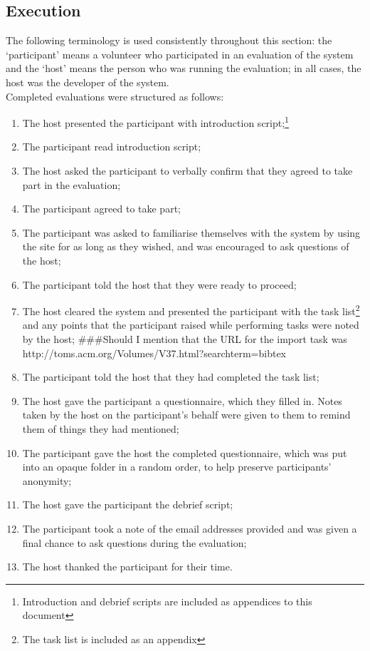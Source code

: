 \documentclass{l4proj}
\newcommand{\revisit}{\#\#\#}
\begin{document}
\subsection{Execution}
The following terminology is used consistently throughout this section: the `participant' means a volunteer who participated in an evaluation of the system and the `host' means the person who was running the evaluation; in all cases, the host was the developer of the system.\\
Completed evaluations were structured as follows:
\begin{enumerate}
	\item The host presented the participant with introduction script;\footnote{Introduction and debrief scripts are included as appendices to this document}
	\item The participant read introduction script;
	\item The host asked the participant to verbally confirm that they agreed to take part in the evaluation;
	\item The participant agreed to take part;
	\item The participant was asked to familiarise themselves with the system by using the site for as long as they wished, and was encouraged to ask questions of the host;
	\item The participant told the host that they were ready to proceed;
	\item The host cleared the system and presented the participant with the task list\footnote{The task list is included as an appendix} and any points that the participant raised while performing tasks were noted by the host; \revisit Should I mention that the URL for the import task was http://toms.acm.org/Volumes/V37.html?searchterm=bibtex
	\item The participant told the host that they had completed the task list;
	\item The host gave the participant a questionnaire, which they filled in. Notes taken by the host on the participant's behalf were given to them to remind them of things they had mentioned;
	\item The participant gave the host the completed questionnaire, which was put into an opaque folder in a random order, to help preserve participants' anonymity;
	\item The host gave the participant the debrief script;
	\item The participant took a note of the email addresses provided and was given a final chance to ask questions during the evaluation;
	\item The host thanked the participant for their time.
\end{enumerate}
\end{document}
